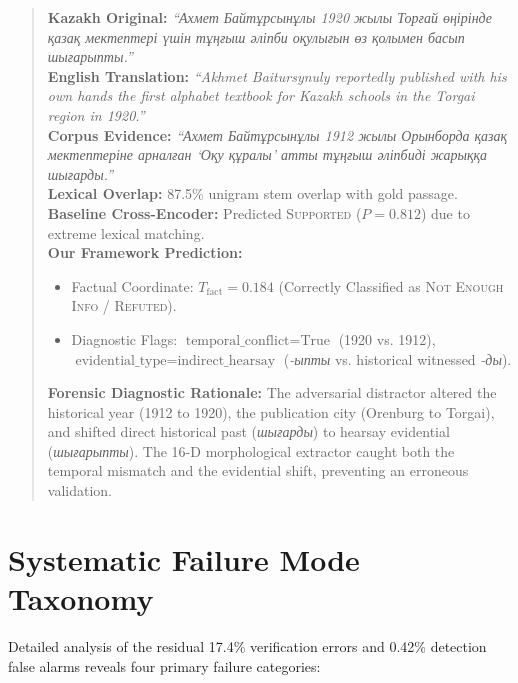 \begin{quote}
\textbf{Kazakh Original:} \textit{``Ахмет Байтұрсынұлы 1920 жылы Торғай өңірінде қазақ мектептері үшін тұңғыш әліпби оқулығын өз қолымен басып шығарыпты.''} \\
\textbf{English Translation:} \textit{``Akhmet Baitursynuly reportedly published with his own hands the first alphabet textbook for Kazakh schools in the Torgai region in 1920.''} \\
\textbf{Corpus Evidence:} \textit{``Ахмет Байтұрсынұлы 1912 жылы Орынборда қазақ мектептеріне арналған `Оқу құралы' атты тұңғыш әліпбиді жарыққа шығарды.''} \\
\textbf{Lexical Overlap:} 87.5\% unigram stem overlap with gold passage. \\
\textbf{Baseline Cross-Encoder:} Predicted \textsc{Supported} ($P = 0.812$) due to extreme lexical matching. \\
\textbf{Our Framework Prediction:}
\begin{itemize}
    \item Factual Coordinate: $T_{\text{fact}} = 0.184$ (Correctly Classified as \textsc{Not Enough Info} / \textsc{Refuted}).
    \item Diagnostic Flags: $\text{temporal\_conflict} = \text{True}$ (1920 vs. 1912), $\text{evidential\_type} = \text{indirect\_hearsay}$ (\textit{-ыпты} vs. historical witnessed \textit{-ды}).
\end{itemize}
\textbf{Forensic Diagnostic Rationale:} The adversarial distractor altered the historical year (1912 to 1920), the publication city (Orenburg to Torgai), and shifted direct historical past (\textit{шығарды}) to hearsay evidential (\textit{шығарыпты}). The 16-D morphological extractor caught both the temporal mismatch and the evidential shift, preventing an erroneous validation.
\end{quote}

\section{Systematic Failure Mode Taxonomy}
\label{sec:app_error_taxonomy}

Detailed analysis of the residual 17.4\% verification errors and 0.42\% detection false alarms reveals four primary failure categories:

